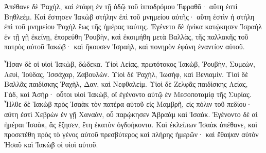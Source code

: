 {Ἀπέθανε δὲ Ῥαχὴλ, καὶ ἐτάφη ἐν τῇ ὁδῷ τοῦ ἱπποδρόμου Ἐφραθᾶ· αὕτη ἐστὶ Βηθλεέμ.
Καὶ ἔστησεν Ἰακὼβ στήλην ἐπὶ τοῦ μνημείου αὐτῆς· αὕτη ἐστὶν ἡ στήλη ἐπὶ τοῦ μνημείου Ῥαχὴλ ἕως τῆς ἡμέρας ταύτης.
Ἐγένετο δὲ ἡνίκα κατῴκησεν Ἰσραὴλ ἐν τῇ γῇ ἐκείνῃ, ἐπορεύθη Ῥουβὴν, καὶ ἐκοιμήθη μετὰ Βαλλὰς, τῆς παλλακῆς τοῦ πατρὸς αὐτοῦ Ἰακώβ· καὶ ἤκουσεν Ἰσραὴλ, καὶ πονηρὸν ἐφάνη ἐναντίον αὐτοῦ.
\par }{\PP Ἦσαν δὲ οἱ υἱοὶ Ἰακὼβ, δώδεκα.
Υἱοὶ Λείας, πρωτότοκος Ἰακὼβ, Ῥουβὴν, Συμεὼν, Λευὶ, Ἰούδας, Ἰσσάχαρ, Ζαβουλών.
Υἱοὶ δὲ Ῥαχὴλ, Ἰωσὴφ, καὶ Βενιαμίν.
Υἱοὶ δὲ Βαλλᾶς παιδίσκης Ῥαχὴλ, Δαν, καὶ Νεφθαλείμ.
Υἱοὶ δὲ Ζελφᾶς παιδίσκης Λείας, Γὰδ, καὶ Ἀσήρ· οὗτοι υἱοὶ Ἰακὼβ, οἳ ἐγένοντο αὐτῷ ἐν Μεσοποταμίᾳ τῆς Συρίας.
Ἦλθε δὲ Ἰακὼβ πρὸς Ἰσαὰκ τὸν πατέρα αὐτοῦ εἰς Μαμβρῆ, εἰς πόλιν τοῦ πεδίου· αὕτη ἐστὶ Χεβρὼν ἐν γῇ Χαναὰν, οὗ παρῴκησεν Ἁβραὰμ καὶ Ἰσαάκ.
Ἐγένοντο δὲ αἱ ἡμέραι Ἰσαὰκ, ἃς ἔζησεν, ἔτη ἑκατὸν ὀγδοήκοντα.
Καὶ ἐκλείπων Ἰσαὰκ ἀπέθανε, καὶ προσετέθη πρὸς τὸ γένος αὐτοῦ πρεσβύτερος καὶ πλήρης ἡμερῶν· καὶ ἔθαψαν αὐτὸν Ἡσαῦ καὶ Ἰακὼβ οἱ υἱοὶ αὐτοῦ.

}
